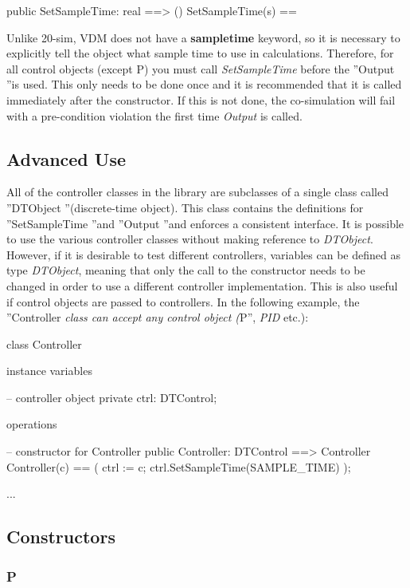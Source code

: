\documentclass{crescendorepchap}
\begin{document}
\begin{vdmrt}
public SetSampleTime: real ==> ()
SetSampleTime(s) ==
\end{vdmrt}

Unlike 20-sim, VDM does not have a \textbf{sampletime} keyword, so it is
necessary to explicitly tell the object what sample time to use in
calculations. Therefore, for all control objects (except P) you must
call \emph{SetSampleTime} before the ''Output ''is used. This only needs
to be done once and it is recommended that it is called immediately
after the constructor. If this is not done, the co-simulation will fail
with a pre-condition violation the first time \emph{Output} is called.

\subsection{Advanced Use}

All of the controller classes in the library are subclasses of a single
class called ''DTObject ''(discrete-time object). This class contains
the definitions for ''SetSampleTime ''and ''Output ''and enforces a
consistent interface. It is possible to use the various controller
classes without making reference to \emph{DTObject}. However, if it is
desirable to test different controllers, variables can be defined as
type \emph{DTObject}, meaning that only the call to the constructor
needs to be changed in order to use a different controller
implementation. This is also useful if control objects are passed to
controllers. In the following example, the ''Controller \emph{class can
accept any control object (}P'', \emph{PID} etc.):

\begin{vdmrt}
class Controller

instance variables

-- controller object
private ctrl: DTControl;

operations

-- constructor for Controller
public Controller: DTControl ==> Controller
Controller(c) ==
(
ctrl := c;
ctrl.SetSampleTime(SAMPLE_TIME)
);

...
\end{vdmrt}

\subsection{Constructors}

\subsubsection{P}
\end{document}

